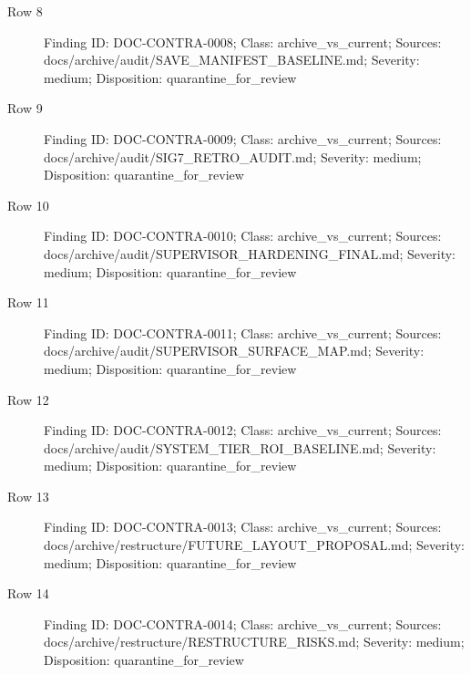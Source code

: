 \documentclass[9pt,a4paper]{book}
\begin{document}
\begin{description}
\item[Row 8] Finding ID: DOC-\allowbreak{}CONTRA-\allowbreak{}0008; Class: archive\_\allowbreak{}vs\_\allowbreak{}current; Sources: docs/\allowbreak{}archive/\allowbreak{}audit/\allowbreak{}SAVE\_\allowbreak{}MANIFEST\_\allowbreak{}BASELINE.\allowbreak{}md; Severity: medium; Disposition: quarantine\_\allowbreak{}for\_\allowbreak{}review
\item[Row 9] Finding ID: DOC-\allowbreak{}CONTRA-\allowbreak{}0009; Class: archive\_\allowbreak{}vs\_\allowbreak{}current; Sources: docs/\allowbreak{}archive/\allowbreak{}audit/\allowbreak{}SIG7\_\allowbreak{}RETRO\_\allowbreak{}AUDIT.\allowbreak{}md; Severity: medium; Disposition: quarantine\_\allowbreak{}for\_\allowbreak{}review
\item[Row 10] Finding ID: DOC-\allowbreak{}CONTRA-\allowbreak{}0010; Class: archive\_\allowbreak{}vs\_\allowbreak{}current; Sources: docs/\allowbreak{}archive/\allowbreak{}audit/\allowbreak{}SUPERVISOR\_\allowbreak{}HARDENING\_\allowbreak{}FINAL.\allowbreak{}md; Severity: medium; Disposition: quarantine\_\allowbreak{}for\_\allowbreak{}review
\item[Row 11] Finding ID: DOC-\allowbreak{}CONTRA-\allowbreak{}0011; Class: archive\_\allowbreak{}vs\_\allowbreak{}current; Sources: docs/\allowbreak{}archive/\allowbreak{}audit/\allowbreak{}SUPERVISOR\_\allowbreak{}SURFACE\_\allowbreak{}MAP.\allowbreak{}md; Severity: medium; Disposition: quarantine\_\allowbreak{}for\_\allowbreak{}review
\item[Row 12] Finding ID: DOC-\allowbreak{}CONTRA-\allowbreak{}0012; Class: archive\_\allowbreak{}vs\_\allowbreak{}current; Sources: docs/\allowbreak{}archive/\allowbreak{}audit/\allowbreak{}SYSTEM\_\allowbreak{}TIER\_\allowbreak{}ROI\_\allowbreak{}BASELINE.\allowbreak{}md; Severity: medium; Disposition: quarantine\_\allowbreak{}for\_\allowbreak{}review
\item[Row 13] Finding ID: DOC-\allowbreak{}CONTRA-\allowbreak{}0013; Class: archive\_\allowbreak{}vs\_\allowbreak{}current; Sources: docs/\allowbreak{}archive/\allowbreak{}restructure/\allowbreak{}FUTURE\_\allowbreak{}LAYOUT\_\allowbreak{}PROPOSAL.\allowbreak{}md; Severity: medium; Disposition: quarantine\_\allowbreak{}for\_\allowbreak{}review
\item[Row 14] Finding ID: DOC-\allowbreak{}CONTRA-\allowbreak{}0014; Class: archive\_\allowbreak{}vs\_\allowbreak{}current; Sources: docs/\allowbreak{}archive/\allowbreak{}restructure/\allowbreak{}RESTRUCTURE\_\allowbreak{}RISKS.\allowbreak{}md; Severity: medium; Disposition: quarantine\_\allowbreak{}for\_\allowbreak{}review

\end{description}
\end{document}
